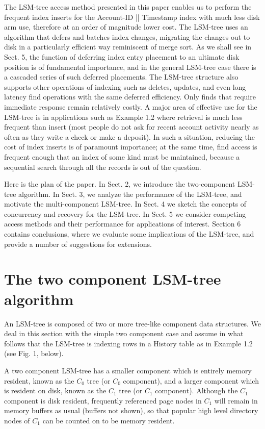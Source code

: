 \documentclass[a4paper,12pt,notitlepage,twoside,openright]{article}
\begin{document}
The LSM-tree access method presented in this paper enables us to perform
the frequent index inserts for the Account-ID || Timestamp index with
much less disk arm use, therefore at an order of magnitude lower cost.
The LSM-tree uses an algorithm that defers and batches index changes,
migrating the changes out to disk in a particularly efficient way
reminiscent of merge sort. As we shall see in Sect. 5, the function of
deferring index entry placement to an ultimate disk position is of
fundamental importance, and in the general LSM-tree case there is a
cascaded series of such deferred placements. The LSM-tree structure also
supports other operations of indexing such as deletes, updates, and even
long latency find operations with the same deferred efficiency. Only finds
that require immediate response remain relatively costly. A major area
of effective use for the LSM-tree is in applications such as Example 1.2
where retrieval is much less frequent than insert (most people do not
ask for recent account activity nearly as often as they write a check or
make a deposit). In such a situation, reducing the cost of index inserts
is of paramount importance; at the same time, find access is frequent
enough that an index of some kind must be maintained, because a
sequential search through all the records is out of the question.

Here is the plan of the paper. In Sect. 2, we introduce the
two-component LSM-tree algorithm. In Sect. 3, we analyze the performance
of the LSM-tree, and motivate the multi-component LSM-tree. In Sect. 4
we sketch the concepts of concurrency and recovery for the LSM-tree. In
Sect. 5 we consider competing access methods and their performance for
applications of interest. Section 6 contains conclusions, where we
evaluate some implications of the LSM-tree, and provide a number of
suggestions for extensions.


\hypertarget{the-two-component-lsm-tree-algorithm}{%
\section{The two component LSM-tree
algorithm}\label{the-two-component-lsm-tree-algorithm}}


An LSM-tree is composed of two or more tree-like component data
structures. We deal in this section with the simple two component case
and assume in what follows that the LSM-tree is indexing rows in a
History table as in Example 1.2 (see Fig. 1, below).

A two component LSM-tree has a smaller component which is entirely
memory resident, known as the \(C_0\) tree (or \(C_0\) component), and a larger
component which is resident on disk, known as the \(C_1\) tree (or \(C_1\)
component). Although the \(C_1\) component is disk resident, frequently
referenced page nodes in \(C_1\) will remain in memory buffers as usual
(buffers not shown), so that popular high level directory nodes of \(C_1\)
can be counted on to be memory resident.
\end{document}
